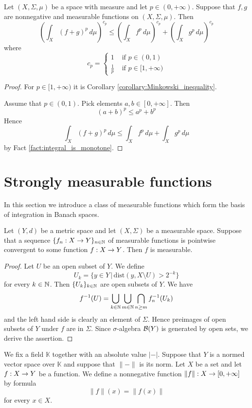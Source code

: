 \documentclass[10pt]{amsart}
\begin{document}
\begin{proposition}\label{proposition:p_power_of_norm_inequality}
	Let $(X,\Sigma,\mu)$ be a space with measure and let $p \in (0,+\infty)$. Suppose that $f,g$ are nonnegative and measurable functions on $(X,\Sigma,\mu)$. Then
	$$\left(\int_X\left(f + g\right)^p\,d\mu\right)^{c_p} \leq
	\left(\int_X f^p\,d\mu\right)^{c_p} + \left(\int_X g^p\,d\mu\right)^{c_p}$$
	where
	$$c_p = \begin{cases}
			1   & \mbox{ if }p\in (0,1)       \\
			\frac{1}{p} & \mbox{ if }p\in [1,+\infty)
		\end{cases}$$
\end{proposition}
\begin{proof}
	For $p \in [1,+\infty)$ it is Corollary \ref{corollary:Minkowski_inequality}.

	Assume that $p \in (0,1)$. Pick elements $a,b\in [0,+\infty]$. Then
	$$\left(a + b\right)^p \leq a^p + b^p$$
	Hence 
	$$\int_X\left(f + g\right)^p\,d\mu \leq
	\int_X f^p\,d\mu + \int_X g^p\,d\mu$$
	by Fact \ref{fact:integral_is_monotone}.
\end{proof}

\section{Strongly measurable functions}
\noindent
In this section we introduce a class of measurable functions which form the basis of integration in Banach spaces.

\begin{proposition}\label{proposition:measurable_functions_closed_under_pointwise_limits}
	Let $(Y,d)$ be a metric space and let $(X,\Sigma)$ be a measurable space. Suppose that a sequence $\{f_n:X\rightarrow Y\}_{n\in {\mathbb N}}$ of measurable functions is pointwise convergent to some function $f:X\rightarrow Y$. Then $f$ is measurable.
\end{proposition}
\begin{proof}
	Let $U$ be an open subset of $Y$. We define
	$$U_k = \big\{y \in Y\,\big|\,\mathrm{dist}\left(y,X\setminus U\right) > 2^{-k}\big\}$$
	for every $k\in {\mathbb N}$. Then $\{U_k\}_{k\in {\mathbb N}}$ are open subsets of $Y$. We have
	$$f^{-1}(U) =\bigcup_{k\in {\mathbb N}}\bigcup_{m\in {\mathbb N}}\bigcap_{n\geq m}f_n^{-1}(U_k)$$
	and the left hand side is clearly an element of $\Sigma$. Hence preimages of open subsets of $Y$ under $f$ are in $\Sigma$. Since $\sigma$-algebra ${\mathcal B}(Y)$ is generated by open sets, we derive the assertion.
\end{proof}
\noindent
We fix a field $\mathbb{K}$ together with an absolute value $|-|$. Suppose that $Y$ is a normed vector space over $\mathbb{K}$ and suppose that $\lVert-\rVert$ is its norm. Let $X$ be a set and let $f:X\rightarrow Y$ be a function. We define a nonnegative function $\lVert f \rVert:X\rightarrow [0,+\infty]$ by formula
$$\lVert f\rVert (x) = \lVert f(x) \rVert$$
for every $x\in X$.
\end{document}
